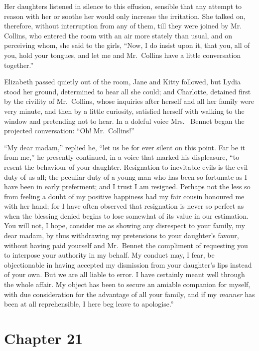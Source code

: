 Her daughters listened in silence to this effusion, sensible
that any attempt to reason with her or soothe her would only
increase the irritation.  She talked on, therefore, without
interruption from any of them, till they were joined by Mr.\ %
Collins, who entered the room with an air more stately than
usual, and on perceiving whom, she said to the girls, ``Now, I do
insist upon it, that you, all of you, hold your tongues, and
let me and Mr.\ Collins have a little conversation together.''

Elizabeth passed quietly out of the room, Jane and Kitty
followed, but Lydia stood her ground, determined to hear all she
could; and Charlotte, detained first by the civility of Mr.\ Collins,
whose inquiries after herself and all her family were very minute,
and then by a little curiosity, satisfied herself with walking to
the window and pretending not to hear.  In a doleful voice Mrs.\ %
Bennet began the projected conversation: ``Oh! Mr.\ Collins!''

``My dear madam,'' replied he, ``let us be for ever silent on this
point.  Far be it from me,'' he presently continued, in a voice that
marked his displeasure, ``to resent the behaviour of your daughter.
Resignation to inevitable evils is the evil duty of us all; the
peculiar duty of a young man who has been so fortunate as I
have been in early preferment; and I trust I am resigned.
Perhaps not the less so from feeling a doubt of my positive
happiness had my fair cousin honoured me with her hand; for I
have often observed that resignation is never so perfect as when
the blessing denied begins to lose somewhat of its value in our
estimation.  You will not, I hope, consider me as showing any
disrespect to your family, my dear madam, by thus withdrawing
my pretensions to your daughter's favour, without having paid
yourself and Mr.\ Bennet the compliment of requesting you to
interpose your authority in my behalf.  My conduct may, I fear,
be objectionable in having accepted my dismission from your
daughter's lips instead of your own.  But we are all liable to
error.  I have certainly meant well through the whole affair.  My
object has been to secure an amiable companion for myself, with
due consideration for the advantage of all your family, and if
my \emph{manner} has been at all reprehensible, I here beg leave to
apologise.''



\chapter{Chapter 21}


